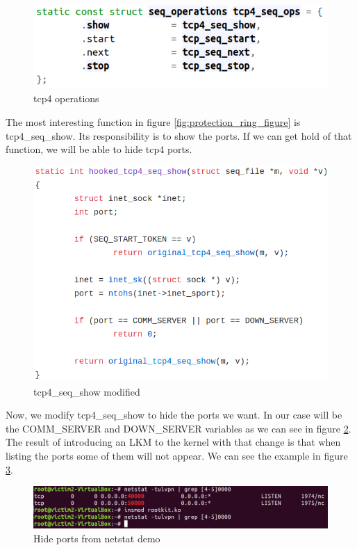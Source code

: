 \documentclass[11pt, a4paper,twoside]{tesi_upf}
\begin{document}
\begin{figure}
    \centering
    \includegraphics[scale=0.7]{images/tcp-seq-file.png}
    \caption{tcp4 operations}
    \label{fig:tcp-seq-file}
\end{figure}

The most interesting function in figure \ref{fig:protection_ring_figure} is tcp4\_seq\_show. Its responsibility is to show the ports. If we can get hold of that function, we will be able to hide tcp4 ports.

\begin{figure}
    \centering
    \includegraphics[scale=0.7]{images/tcp4-hooked.png}
    \caption{tcp4\_seq\_show modified}
    \label{fig:tcp4-modified}
\end{figure}

Now, we modify tcp4\_seq\_show to hide the ports we want. In our case will be the COMM\_SERVER and DOWN\_SERVER variables as we can see in figure \ref{fig:tcp4-modified}. The result of introducing an LKM to the kernel with that change is that when listing the ports some of them will not appear. We can see the example in figure \ref{fig:hide-from-netstat}.

\begin{figure}
    \centering
    \includegraphics[width=\linewidth]{images/hide-ports-from-netstat.png}
    \caption{Hide ports from netstat demo}
    \label{fig:hide-from-netstat}
\end{figure}
\end{document}
